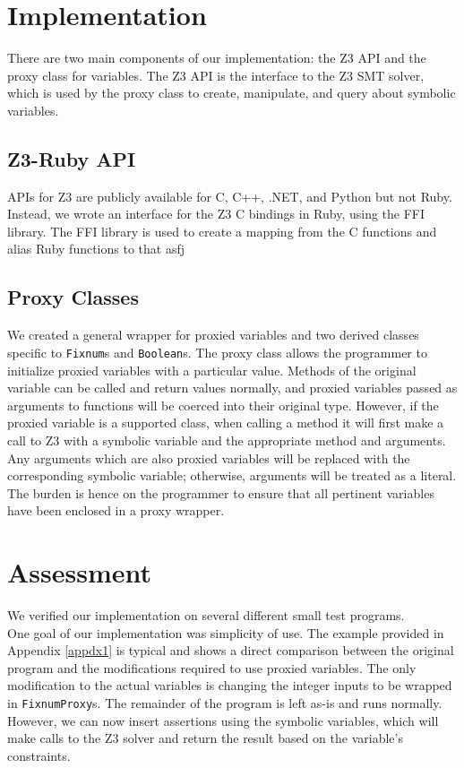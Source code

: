 \documentclass[10pt]{article}
\begin{document}
\section{Implementation}
There are two main components of our implementation: the Z3 API and the proxy class for variables.  The Z3 API is the interface to the Z3 SMT solver, which is used by the proxy class to create, manipulate, and query about symbolic variables.\\

\subsection{Z3-Ruby API}
APIs for Z3 are publicly available for C, C++, .NET, and Python \textemdash but not Ruby.  Instead, we wrote an interface for the Z3 C bindings in Ruby, using the FFI library.  The FFI library is used to create a mapping from the C functions and alias Ruby functions to that asfj

\subsection{Proxy Classes}
We created a general wrapper for proxied variables and two derived classes specific to \texttt{Fixnum}s and \texttt{Boolean}s.  The proxy class allows the programmer to initialize proxied variables with a particular value.  Methods of the original variable can be called and return values normally, and proxied variables passed as arguments to functions will be coerced into their original type.  However, if the proxied variable is a supported class, when calling a method it will first make a call to Z3 with a symbolic variable and the appropriate method and arguments.  Any arguments which are also proxied variables will be replaced with the corresponding symbolic variable; otherwise, arguments will be treated as a literal.  The burden is hence on the programmer to ensure that all pertinent variables have been enclosed in a proxy wrapper.\\

\section{Assessment}
We verified our implementation on several different small test programs.\\

One goal of our implementation was simplicity of use.  The example provided in Appendix \ref{appdx1} is typical and shows a direct comparison between the original program and the modifications required to use proxied variables.  The only modification to the actual variables is changing the integer inputs to be wrapped in \texttt{FixnumProxy}s.  The remainder of the program is left as-is and runs normally.  However, we can now insert assertions using the symbolic variables, which will make calls to the Z3 solver and return the result based on the variable's constraints.
\end{document}
